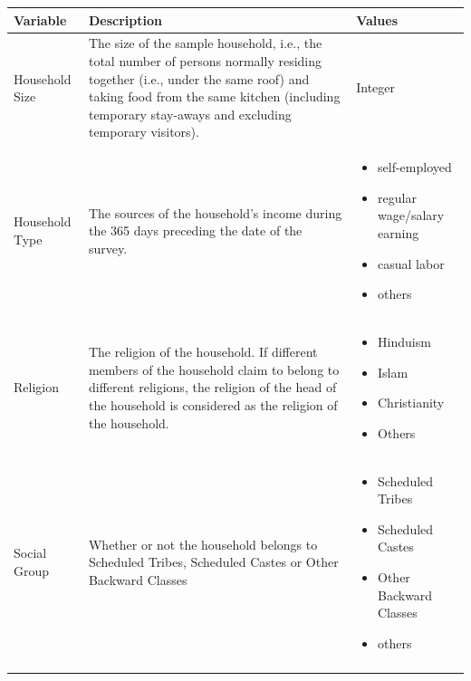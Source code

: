 \begin{tabular}{lp{6cm}p{6cm}}
	\toprule
	\textbf{Variable} & \textbf{Description} & \textbf{Values}\\
	\midrule
	Household Size & The size of the sample household, i.e., the total number of persons normally residing together (i.e., under the same roof) and taking food from the same kitchen (including temporary stay-aways and excluding temporary visitors). & Integer\\
	\addlinespace
	
	Household Type & The sources of the household's income during the 365 days preceding the date of the survey. & \vspace{-7pt}
	\begin{itemize}[left=0pt, topsep=0pt, partopsep=0pt, itemsep=0pt, parsep=0pt]
		\item self-employed
		\item regular wage/salary earning
		\item casual labor
		\item others
	\end{itemize}\\
	\addlinespace
	
	Religion & The religion of the household. If different members of the household claim to belong to different religions, the religion of the head of the household is considered as the religion of the household. & 	 \vspace{-7pt}
	\begin{itemize}[left=0pt, topsep=0pt, partopsep=0pt, itemsep=0pt, parsep=0pt]
		\item Hinduism
		\item Islam
		\item Christianity
		\item Others
	\end{itemize}\\
	\addlinespace
	
	Social Group & Whether or not the household belongs to Scheduled Tribes, Scheduled Castes or Other Backward Classes & 
	 \vspace{-7pt}
	\begin{itemize}[left=0pt, topsep=0pt, partopsep=0pt, itemsep=0pt, parsep=0pt]
		\item Scheduled Tribes
		\item Scheduled Castes
		\item Other Backward Classes
		\item others    
	\end{itemize}\\
	\addlinespace
	

\end{tabular}
